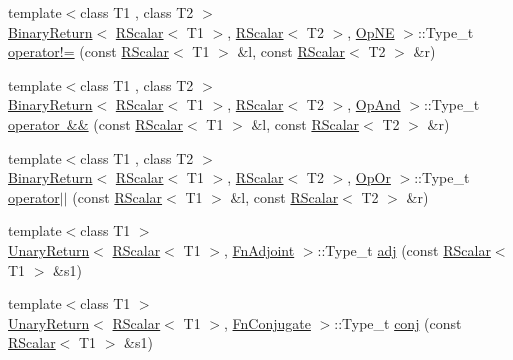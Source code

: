 \begin{DoxyCompactItemize}
\item 
{\footnotesize template$<$class T1 , class T2 $>$ }\\\mbox{\hyperlink{structENSEM_1_1BinaryReturn}{Binary\+Return}}$<$ \mbox{\hyperlink{classENSEM_1_1RScalar}{R\+Scalar}}$<$ T1 $>$, \mbox{\hyperlink{classENSEM_1_1RScalar}{R\+Scalar}}$<$ T2 $>$, \mbox{\hyperlink{structENSEM_1_1OpNE}{Op\+NE}} $>$\+::Type\+\_\+t \mbox{\hyperlink{group__rscalar_gacbd0811ec4f0f394ce57abefb7e699fc}{operator!=}} (const \mbox{\hyperlink{classENSEM_1_1RScalar}{R\+Scalar}}$<$ T1 $>$ \&l, const \mbox{\hyperlink{classENSEM_1_1RScalar}{R\+Scalar}}$<$ T2 $>$ \&r)
\item 
{\footnotesize template$<$class T1 , class T2 $>$ }\\\mbox{\hyperlink{structENSEM_1_1BinaryReturn}{Binary\+Return}}$<$ \mbox{\hyperlink{classENSEM_1_1RScalar}{R\+Scalar}}$<$ T1 $>$, \mbox{\hyperlink{classENSEM_1_1RScalar}{R\+Scalar}}$<$ T2 $>$, \mbox{\hyperlink{structENSEM_1_1OpAnd}{Op\+And}} $>$\+::Type\+\_\+t \mbox{\hyperlink{group__rscalar_ga142a7a22c88f64f590411925c5c3cdcd}{operator \&\&}} (const \mbox{\hyperlink{classENSEM_1_1RScalar}{R\+Scalar}}$<$ T1 $>$ \&l, const \mbox{\hyperlink{classENSEM_1_1RScalar}{R\+Scalar}}$<$ T2 $>$ \&r)
\item 
{\footnotesize template$<$class T1 , class T2 $>$ }\\\mbox{\hyperlink{structENSEM_1_1BinaryReturn}{Binary\+Return}}$<$ \mbox{\hyperlink{classENSEM_1_1RScalar}{R\+Scalar}}$<$ T1 $>$, \mbox{\hyperlink{classENSEM_1_1RScalar}{R\+Scalar}}$<$ T2 $>$, \mbox{\hyperlink{structENSEM_1_1OpOr}{Op\+Or}} $>$\+::Type\+\_\+t \mbox{\hyperlink{group__rscalar_gad6b0ec6a8079826234d7bef5fa862c57}{operator$\vert$$\vert$}} (const \mbox{\hyperlink{classENSEM_1_1RScalar}{R\+Scalar}}$<$ T1 $>$ \&l, const \mbox{\hyperlink{classENSEM_1_1RScalar}{R\+Scalar}}$<$ T2 $>$ \&r)
\item 
{\footnotesize template$<$class T1 $>$ }\\\mbox{\hyperlink{structENSEM_1_1UnaryReturn}{Unary\+Return}}$<$ \mbox{\hyperlink{classENSEM_1_1RScalar}{R\+Scalar}}$<$ T1 $>$, \mbox{\hyperlink{structENSEM_1_1FnAdjoint}{Fn\+Adjoint}} $>$\+::Type\+\_\+t \mbox{\hyperlink{group__rscalar_ga7c3fdb23cffd473f858244b3284a9620}{adj}} (const \mbox{\hyperlink{classENSEM_1_1RScalar}{R\+Scalar}}$<$ T1 $>$ \&s1)
\item 
{\footnotesize template$<$class T1 $>$ }\\\mbox{\hyperlink{structENSEM_1_1UnaryReturn}{Unary\+Return}}$<$ \mbox{\hyperlink{classENSEM_1_1RScalar}{R\+Scalar}}$<$ T1 $>$, \mbox{\hyperlink{structENSEM_1_1FnConjugate}{Fn\+Conjugate}} $>$\+::Type\+\_\+t \mbox{\hyperlink{group__rscalar_ga24609fe5d05b5967e364924ef6d13929}{conj}} (const \mbox{\hyperlink{classENSEM_1_1RScalar}{R\+Scalar}}$<$ T1 $>$ \&s1)

\end{DoxyCompactItemize}
